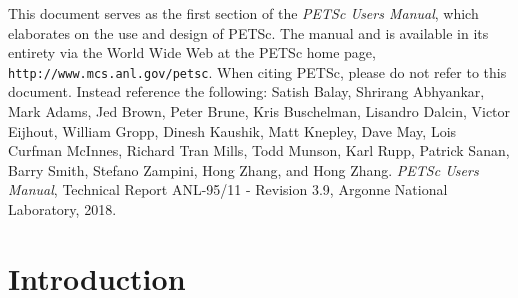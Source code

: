 \vspace{1.0cm}



 This document serves as the first section of the {\em PETSc Users
Manual}, which elaborates on the use and design of PETSc. The
manual and is available in its entirety via the World Wide Web at
the PETSc home page, {\tt http://www.mcs.anl.gov/petsc}.
When citing PETSc, please do
not refer to this document. Instead reference the following: Satish
Balay, Shrirang Abhyankar, Mark Adams, Jed Brown, Peter Brune, Kris Buschelman, Lisandro Dalcin, Victor Eijhout, William Gropp, Dinesh Kaushik, Matt Knepley, Dave May,
Lois Curfman McInnes, Richard Tran Mills, Todd Munson, Karl Rupp, Patrick Sanan, Barry Smith, Stefano Zampini, Hong Zhang, and Hong Zhang.  {\em
PETSc Users Manual}, Technical Report ANL-95/11 - Revision 3.9,
Argonne National Laboratory, 2018.

%
\newpage


\newpage
\section{Introduction}



